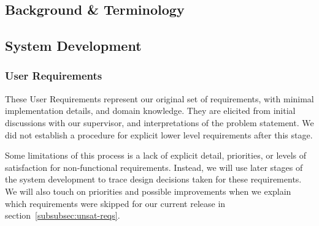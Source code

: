     \subsection{Background \& Terminology}\label{subsec:background-&-terminology}

    \subsection{System Development}

    \label{subsec:system-development}
    \subsubsection{User Requirements}\label{subsubsec:user-reqs}

    These User Requirements represent our original set of requirements, with minimal implementation details, and domain knowledge.
    They are elicited from initial discussions with our supervisor,
    and interpretations of the problem statement.
    We did not establish a procedure for explicit lower level requirements after this stage.

    Some limitations of this process is a lack of explicit detail, priorities, or levels of satisfaction for non-functional requirements.
    Instead, we will use later stages of the system development to trace design decisions taken for these requirements.
    We will also touch on priorities and possible improvements when we explain
    which requirements were skipped for our current release in section~\ref{subsubsec:unsat-reqs}.

